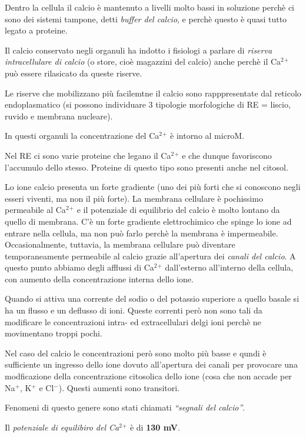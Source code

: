 \documentclass[]{article}
\begin{document}
Dentro la cellula il calcio è mantenuto a livelli molto bassi in
soluzione perchè ci sono dei sistemi tampone, detti \emph{buffer del
calcio}, e perchè questo è quasi tutto legato a proteine.

Il calcio conservato negli organuli ha indotto i fisiologi a parlare di
\emph{riserva intracellulare di calcio} (o store, cioè magazzini del
calcio) anche perchè il Ca\(^2\)\(^+\) può essere rilasicato da queste
riserve.

Le riserve che mobilizzano più facilemtne il calcio sono rapppresentate
dal reticolo endoplasmatico (si possono individuare 3 tipologie
morfologiche di RE = liscio, ruvido e membrana nucleare).

In questi organuli la concentrazione del Ca\(^2\)\(^+\) è intorno al
microM.

Nel RE ci sono varie proteine che legano il Ca\(^2\)\(^+\) e che dunque
favoriscono l'accumulo dello stesso. Proteine di questo tipo sono
presenti anche nel citosol.

Lo ione calcio presenta un forte gradiente (uno dei più forti che si
conoscono negli esseri viventi, ma non il più forte). La membrana
cellulare è pochissimo permeabile al Ca\(^2\)\(^+\) e il potenziale di
equilibrio del calcio è molto lontano da quello di membrana. C'è un
forte gradiente elettrochimico che spinge lo ione ad entrare nella
cellula, ma non può farlo perchè la membrana è impermeabile.
Occasionalmente, tuttavia, la membrana cellulare può diventare
temporaneamente permeabile al calcio grazie all'apertura dei
\emph{canali del calcio}. A questo punto abbiamo degli afflussi di
Ca\(^2\)\(^+\) dall'esterno all'interno della cellula, con aumento della
concentrazione interna dello ione.

Quando si attiva una corrente del sodio o del potassio superiore a
quello basale si ha un flusso e un deflusso di ioni. Queste correnti
però non sono tali da modificare le concentrazioni intra- ed
extracellulari delgi ioni perchè ne movimentano troppi pochi.

Nel caso del calcio le concentrazioni però sono molto più basse e qundi
è sufficiente un ingresso dello ione dovuto all'apertura dei canali per
provocare una modficazione della concentrazione citosolica dello ione
(cosa che non accade per Na\(^+\), K\(^+\) e Cl\(^-\)). Questi aumenti
sono transitori.

Fenomeni di questo genere sono stati chiamati \emph{``segnali del
calcio''}.

Il \emph{potenziale di equilibiro del Ca\(^2\)\(^+\)} è di \textbf{130
mV}.
\end{document}
